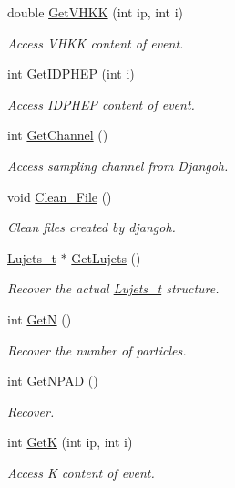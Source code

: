 \begin{DoxyCompactItemize}
double \hyperlink{class_t_djangoh_ab8bbab97c50a6a9f296fbd0d78e98e17}{Get\+V\+H\+KK} (int ip, int i)
\begin{DoxyCompactList}\small\item\em Access V\+H\+KK content of event. \end{DoxyCompactList}\item 
int \hyperlink{class_t_djangoh_aaa275337568bcd47d87a63f1de688d27}{Get\+I\+D\+P\+H\+EP} (int i)
\begin{DoxyCompactList}\small\item\em Access I\+D\+P\+H\+EP content of event. \end{DoxyCompactList}\item 
int \hyperlink{class_t_djangoh_a381b6da1d6ef7145d9b4e49afb44a654}{Get\+Channel} ()
\begin{DoxyCompactList}\small\item\em Access sampling channel from Djangoh. \end{DoxyCompactList}\item 
void \hyperlink{class_t_djangoh_adf5acc5294013735f2475d4ce8ccf012}{Clean\+\_\+\+File} ()
\begin{DoxyCompactList}\small\item\em Clean files created by djangoh. \end{DoxyCompactList}\item 
\hyperlink{struct_lujets__t}{Lujets\+\_\+t} $\ast$ \hyperlink{class_t_djangoh_a2572e682379a304f84f21840d488fa0c}{Get\+Lujets} ()
\begin{DoxyCompactList}\small\item\em Recover the actual \hyperlink{struct_lujets__t}{Lujets\+\_\+t} structure. \end{DoxyCompactList}\item 
int \hyperlink{class_t_djangoh_a501e50bbb1ad6a75014fd7c555313b74}{GetN} ()
\begin{DoxyCompactList}\small\item\em Recover the number of particles. \end{DoxyCompactList}\item 
int \hyperlink{class_t_djangoh_afb58be11a10e8a6a4b442ea0fe4e16f5}{Get\+N\+P\+AD} ()
\begin{DoxyCompactList}\small\item\em Recover. \end{DoxyCompactList}\item 
int \hyperlink{class_t_djangoh_aaf2c94dbb8382bbd3b7ed1530a8ac878}{GetK} (int ip, int i)
\begin{DoxyCompactList}\small\item\em Access K content of event. \end{DoxyCompactList}\item 

\end{DoxyCompactItemize}
